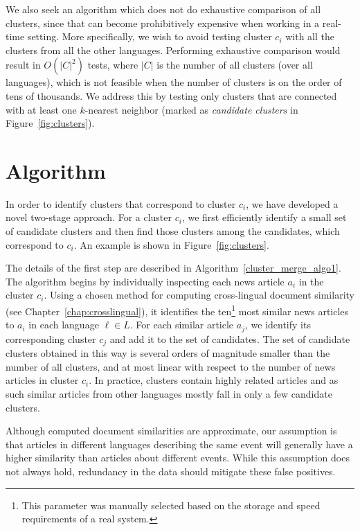 We also seek an algorithm which does not do exhaustive comparison of all clusters, since that can become prohibitively expensive when working in a real-time setting. More specifically, we wish to avoid testing cluster $c_i$ with all the clusters from all the other languages. Performing exhaustive comparison would result in $O(|C|^2)$ tests, where $|C|$ is the number of all clusters (over all languages), which is not feasible when the number of clusters is on the order of tens of thousands. We address this by testing only clusters that are connected with at least one $k$-nearest neighbor (marked as \emph{candidate clusters} in Figure~\ref{fig:clusters}).

\section{Algorithm}\label{algo:features}

In order to identify clusters that correspond to cluster $c_i$, we have developed
a novel two-stage approach. For a cluster $c_i$, we first efficiently identify a small set of
candidate clusters and then find those clusters among the candidates, which correspond to $c_i$.
An example is  shown in  Figure~\ref{fig:clusters}.

The details of the first step are described in Algorithm~\ref{cluster_merge_algo1}. The algorithm
begins by individually inspecting each news article $a_i$ in the cluster $c_i$. Using a chosen
method for computing cross-lingual document similarity (see Chapter~\ref{chap:crosslingual}), it identifies
the ten\footnote{This parameter was manually selected based on the storage and speed requirements of a real system.}
most similar news articles to $a_i$ in each language $\ell \in L$. For each similar
article $a_j$, we identify its corresponding  cluster $c_j$ and add it to the set of candidates.
The set of candidate clusters obtained in this way is several orders of magnitude smaller than the
number of all clusters, and at most linear with respect to the number of news articles in
cluster $c_i$. In practice, clusters contain highly related articles and as such similar
articles from other languages mostly fall in only a few candidate clusters.

Although computed document similarities are approximate, our  assumption is that articles
in different languages describing the same event will generally have a higher similarity
than articles about different events. While this assumption does not always hold, redundancy
in the data should mitigate these false positives.

